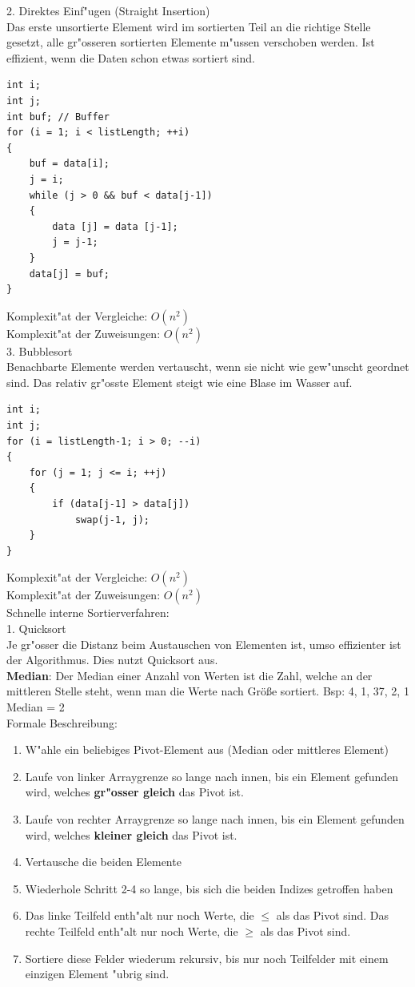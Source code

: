 2. Direktes Einf"ugen (Straight Insertion)\\
Das erste unsortierte Element wird im sortierten Teil an die richtige Stelle gesetzt, alle gr"osseren sortierten Elemente m"ussen verschoben werden.
Ist effizient, wenn die Daten schon etwas sortiert sind. 
\begin{lstlisting}[style=C]
int i;
int j;
int buf; // Buffer
for (i = 1; i < listLength; ++i)
{
	buf = data[i];
	j = i;
	while (j > 0 && buf < data[j-1])
	{
		data [j] = data [j-1];
		j = j-1;
	}
	data[j] = buf;
}
\end{lstlisting} 
Komplexit"at der Vergleiche: $O(n^2)$\\
Komplexit"at der Zuweisungen: $O(n^2)$\\

3. Bubblesort\\
Benachbarte Elemente werden vertauscht, wenn sie nicht wie gew"unscht geordnet sind. Das relativ gr"osste Element steigt wie eine Blase im Wasser auf. 
\begin{lstlisting}[style=C]
int i;
int j;
for (i = listLength-1; i > 0; --i)
{
	for (j = 1; j <= i; ++j)
	{
		if (data[j-1] > data[j])
			swap(j-1, j);
	}
}
\end{lstlisting} 
Komplexit"at der Vergleiche: $O(n^2)$\\
Komplexit"at der Zuweisungen: $O(n^2)$\\

Schnelle interne Sortierverfahren:\\
1. Quicksort\\
Je gr"osser die Distanz beim Austauschen von Elementen ist, umso effizienter ist der Algorithmus. Dies nutzt Quicksort aus.\\
\textbf{Median}: Der Median einer Anzahl von Werten ist die Zahl, welche an der mittleren Stelle steht, wenn man die Werte nach Größe sortiert. Bsp: {4, 1, 37, 2, 1} Median = 2\\
Formale Beschreibung: \\
\begin{enumerate}
\item W"ahle ein beliebiges Pivot-Element aus (Median oder mittleres Element)
\item Laufe von linker Arraygrenze so lange nach innen, bis ein Element gefunden wird, welches \textbf{gr"osser gleich} das Pivot ist. 
\item Laufe von rechter Arraygrenze so lange nach innen, bis ein Element gefunden wird, welches \textbf{kleiner gleich} das Pivot ist. 
\item Vertausche die beiden Elemente
\item Wiederhole Schritt 2-4 so lange, bis sich die beiden Indizes getroffen haben
\item Das linke Teilfeld enth"alt nur noch Werte, die $\leq$ als das Pivot sind. Das rechte Teilfeld enth"alt nur noch Werte, die $\geq$ als das Pivot sind. 
\item Sortiere diese Felder wiederum rekursiv, bis nur noch Teilfelder mit einem einzigen Element "ubrig sind.
\end{enumerate}

